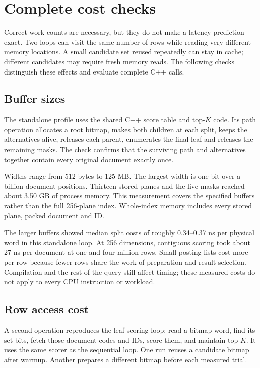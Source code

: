 \section{Complete cost checks}
\label{sec:cost-validation}
Correct work counts are necessary, but they do not make a latency prediction exact. Two loops
can visit the same number of rows while reading very different memory locations. A small
candidate set reused repeatedly can stay in cache; different candidates may require fresh
memory reads. The following checks distinguish these effects and evaluate complete C++ calls.

\subsection{Buffer sizes}
The standalone profile uses the shared C++ score table and top-$K$ code. Its path operation
allocates a root bitmap, makes both children at each split, keeps the alternatives alive,
releases each parent, enumerates the final leaf and releases the remaining masks. The check confirms that the surviving path and alternatives together contain every original
document exactly once.

Widths range from 512 bytes to 125 MB. The largest width is one bit over a billion document
positions. Thirteen stored planes and the live masks reached about 3.50 GB of process memory.
This measurement covers the specified buffers rather than the full 256-plane index.
Whole-index memory includes every stored plane, packed document and ID.

The larger buffers showed median split costs of roughly 0.34--0.37 ns per physical word in this
standalone loop. At 256 dimensions, contiguous scoring took about 27 ns per document at one
and four million rows. Small posting lists cost more per row because fewer rows share the work of preparation and
result selection. Compilation and the rest of the query still affect timing; these measured
costs do not apply to every CPU instruction or workload.

\subsection{Row access cost}
A second operation reproduces the leaf-scoring loop: read a bitmap word, find its set bits,
fetch those document codes and IDs, score them, and maintain top $K$. It uses the same scorer
as the sequential loop. One run reuses a candidate bitmap after warmup. Another prepares a
different bitmap before each measured trial.

